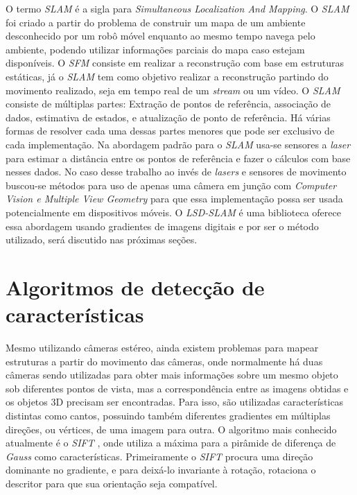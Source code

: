 O termo \textit{SLAM} é a sigla para \textit{Simultaneous Localization And Mapping}. O \textit{SLAM} foi criado a partir do problema de construir um mapa de um ambiente desconhecido por um robô móvel enquanto ao mesmo tempo navega pelo ambiente, podendo utilizar informações parciais do mapa caso estejam disponíveis. O \textit{SFM} consiste em realizar a reconstrução com base em estruturas estáticas, já o \textit{SLAM} tem como objetivo realizar a reconstrução partindo do movimento realizado, seja em tempo real de um \textit{stream} ou um vídeo. O \textit{SLAM} consiste de múltiplas partes: Extração de pontos de referência, associação de dados, estimativa de estados, e atualização de ponto de referência. Há várias formas de resolver cada uma dessas partes menores que pode ser exclusivo de cada implementação\cite{SLAM-Dummies}. Na abordagem padrão para o \textit{SLAM} usa-se sensores a \textit{laser} para estimar a distância entre os pontos de referência e fazer o cálculos com base nesses dados. No caso desse trabalho ao invés de \textit{lasers} e sensores de movimento buscou-se métodos para uso de apenas uma câmera em junção com \textit{Computer Vision e Multiple View Geometry} para que essa implementação possa ser usada potencialmente em dispositivos móveis. O \textit{LSD-SLAM} é uma biblioteca oferece essa abordagem usando gradientes de imagens digitais e por ser o método utilizado, será discutido nas próximas seções.



\section{Algoritmos de detecção de características}
  
Mesmo utilizando câmeras estéreo, ainda existem problemas para mapear estruturas a partir do movimento das câmeras, onde normalmente há duas câmeras sendo utilizadas para obter mais informações sobre um mesmo objeto sob diferentes pontos de vista, mas a correspondência entre as imagens obtidas e os objetos 3D precisam ser encontradas. Para isso, são utilizadas características distintas como cantos, possuindo também diferentes gradientes em múltiplas direções, ou vértices, de uma imagem para outra. O algoritmo mais conhecido atualmente é o \textit{SIFT} \cite{SIFT}, onde utiliza a máxima para a pirâmide de diferença de \textit{Gauss} como características. Primeiramente o \textit{SIFT} procura uma direção dominante no gradiente, e para deixá-lo invariante à rotação, rotaciona o descritor para que sua orientação seja compatível.
  
